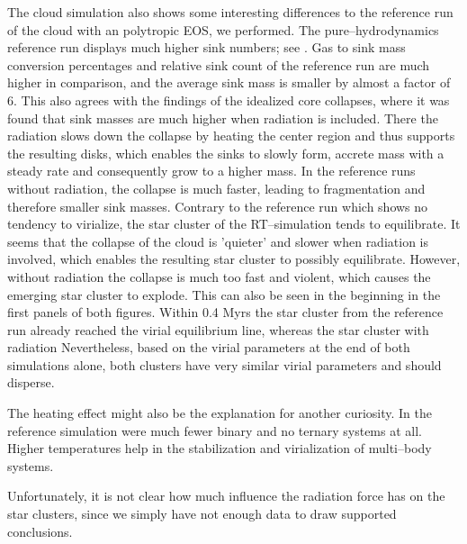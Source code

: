 The cloud simulation also shows some interesting differences to the reference run of the cloud with an polytropic EOS, we performed.
The pure--hydrodynamics reference run displays much higher sink numbers; see .
Gas to sink mass conversion percentages and relative sink count of the reference run are much higher in comparison, and the average sink mass is smaller by almost a factor of 6.
This also agrees with the findings of the idealized core collapses, where it was found that sink masses are much higher when radiation is included.
There the radiation slows down the collapse by heating the center region and thus supports the resulting disks, which enables the sinks to slowly form, accrete mass with a steady rate and consequently grow to a higher mass.
In the reference runs without radiation, the collapse is much faster, leading to fragmentation and therefore smaller sink masses.
Contrary to the reference run which shows no tendency to virialize, the star cluster of the RT--simulation tends to equilibrate.
It seems that the collapse of the cloud is 'quieter' and slower when radiation is involved, which enables the resulting star cluster to possibly equilibrate.
However, without radiation the collapse is much too fast and violent, which causes the emerging star cluster to explode.
This can also be seen in the beginning in the first panels of both figures.
Within 0.4 Myrs the star cluster from the reference run already reached the virial equilibrium line, whereas the star cluster with radiation
Nevertheless, based on the virial parameters at the end of both simulations alone, both clusters have very similar virial parameters and should disperse.

The heating effect might also be the explanation for another curiosity.
In the reference simulation were much fewer binary and no ternary systems at all.
Higher temperatures help in the stabilization and virialization of multi--body systems.

Unfortunately, it is not clear how much influence the radiation force has on the star clusters, since we simply have not enough data to draw supported conclusions.

